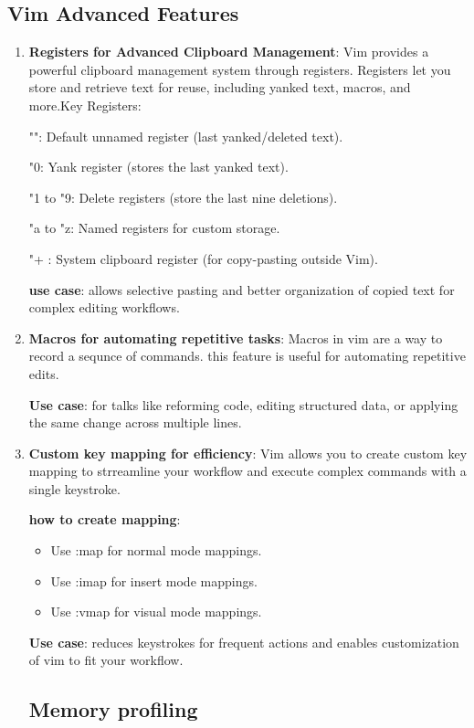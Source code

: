 \documentclass[12pt, letterpaper]{article}
\begin{document}
\subsection{Vim Advanced Features}
\begin{enumerate}
    \item \textbf{Registers for Advanced Clipboard Management}: Vim provides a powerful clipboard management system through registers. Registers let you store and retrieve text for reuse, including yanked text, macros, and more.Key Registers:
    
    "": Default unnamed register (last yanked/deleted text).
    
    "0: Yank register (stores the last yanked text).
    
    "1 to "9: Delete registers (store the last nine deletions).
    
    "a to "z: Named registers for custom storage.
    
    "+ : System clipboard register (for copy-pasting outside Vim).
    
    \textbf{use case}: allows selective pasting and better organization of copied text for complex editing workflows.

    \item \textbf{Macros for automating repetitive tasks}: Macros in vim are a way to record a sequnce of commands. this feature is useful for automating repetitive edits.

    \textbf{Use case}: for talks like reforming code, editing structured data, or applying the same change across multiple lines.
    \item \textbf{Custom key mapping for efficiency}: Vim allows you to create custom key mapping to strreamline your workflow and execute complex commands with a single keystroke.

    \textbf{how to create mapping}:

    \begin{itemize}
  \item Use :map for normal mode mappings.
  \item Use :imap for insert mode mappings.
  \item Use :vmap for visual mode mappings.
\end{itemize}

    \textbf{Use case}: reduces keystrokes for frequent actions and enables customization of vim to fit your workflow.
\subsection{Memory profiling}

\end{enumerate}
\end{document}
